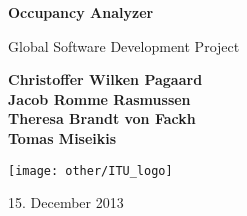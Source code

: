 \begin{titlepage}
	\begin{center}
		\vspace*{1cm}
		
		\Huge
		\textbf{Occupancy Analyzer}
		
		\vspace{0.5cm}
		\LARGE
		Global Software Development Project
		
		\vspace{1.5cm}
		
		\textbf{
			Christoffer Wilken Pagaard\\
			Jacob Romme Rasmussen\\
			Theresa Brandt von Fackh\\
			Tomas Miseikis\\
		}
		
		\vfill

		\vspace{0.8cm}
		
		\texttt{[image: other/ITU\_logo]}
		
		\Large
		15. December 2013
		
	\end{center}
\end{titlepage}